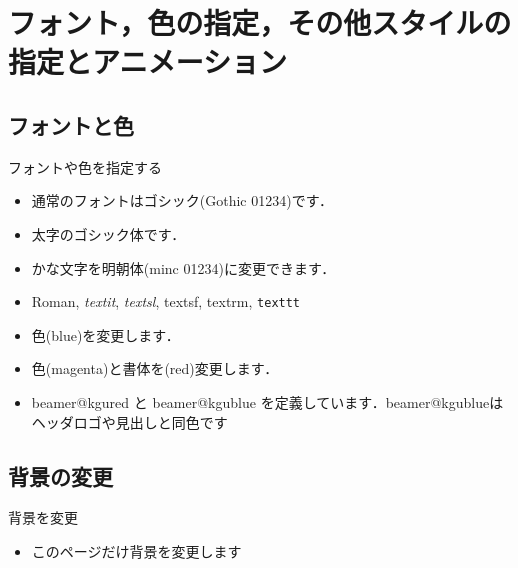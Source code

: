 \section{フォント，色の指定，その他スタイルの指定とアニメーション}

\subsection{フォントと色}

\begin{frame}{フォントや色を指定する}
  \begin{itemize}
    \item 通常のフォントはゴシック(Gothic 01234)です．
    \item {\bgoth 太字のゴシック体です．}
    \item {\minc かな文字を明朝体(minc 01234)に変更できます．}
    \item {\rm Roman}, \textit{textit}, \textsl{textsl}, \textsf{textsf}, \textrm{textrm}, \texttt{texttt}
    \item {\color{blue}色(blue)を変更します．}
    \item {\color{magenta}\bgoth 色(magenta)と書体を}{\color{red}\bgoth (red)変更します．}
    \item {\color{beamer@kgured}\bgoth beamer@kgured} と {\color{beamer@kgublue}\bgoth beamer@kgublue} を定義しています．{\color{beamer@kgublue}\bgoth beamer@kgublueはヘッダロゴや見出しと同色です}
  \end{itemize}
\end{frame}

\subsection{背景の変更}
{
\begin{frame}{背景を変更}
  \begin{itemize}
    \item このページだけ背景を変更します
  \end{itemize}
\end{frame}
}


